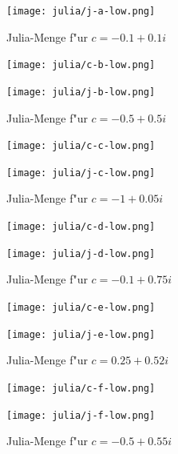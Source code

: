 \begin{refsection}
\begin{figure}
\begin{center}
\bigskip

\texttt{[image: julia/j-a-low.png]}
\end{center}
\caption{Julia-Menge f"ur $c= -0.1+0.1i$\label{julia:a}}
\end{figure}

\begin{figure}
\begin{center}
\texttt{[image: julia/c-b-low.png]}

\bigskip

\texttt{[image: julia/j-b-low.png]}
\end{center}
\caption{Julia-Menge f"ur $c= -0.5+0.5i$\label{julia:b}}
\end{figure}

\begin{figure}
\begin{center}
\texttt{[image: julia/c-c-low.png]}

\bigskip

\texttt{[image: julia/j-c-low.png]}
\end{center}
\caption{Julia-Menge f"ur $c= -1+0.05i$\label{julia:c}}
\end{figure}

\begin{figure}
\begin{center}
\texttt{[image: julia/c-d-low.png]}

\bigskip

\texttt{[image: julia/j-d-low.png]}
\end{center}
\caption{Julia-Menge f"ur $c= -0.1+0.75i$\label{julia:d}}
\end{figure}

\begin{figure}
\begin{center}
\texttt{[image: julia/c-e-low.png]}

\bigskip

\texttt{[image: julia/j-e-low.png]}
\end{center}
\caption{Julia-Menge f"ur $c= 0.25+0.52i$\label{julia:e}}
\end{figure}

\begin{figure}
\begin{center}
\texttt{[image: julia/c-f-low.png]}

\bigskip

\texttt{[image: julia/j-f-low.png]}
\end{center}
\caption{Julia-Menge f"ur $c= -0.5+0.55i$\label{julia:f}}
\end{figure}


\end{refsection}
